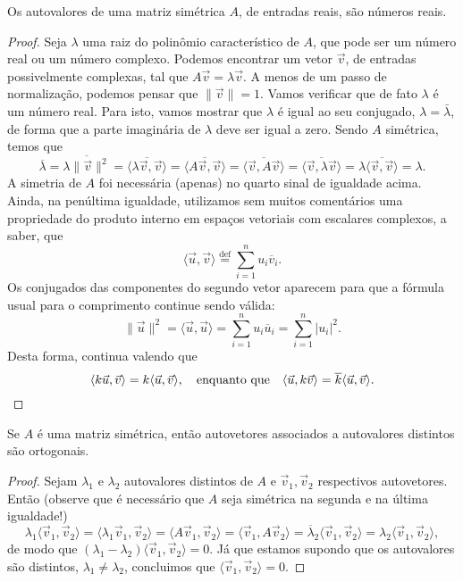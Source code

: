 \documentclass[../livro.tex]{subfiles}
\begin{document}
\begin{proposition}\label{reais}
	Os autovalores de uma matriz simétrica $A$, de entradas reais, são números reais.
\end{proposition}

\begin{proof}
	Seja $\lambda$ uma raiz do polinômio característico de $A$, que pode ser um número real ou um número complexo. Podemos encontrar um vetor $\vec{v}$, de entradas possivelmente complexas, tal que $A\vec{v} = \lambda \vec{v}$. A menos de um passo de normalização, podemos pensar que $\|\vec{v}\| = 1$. Vamos verificar que de fato $\lambda$ é um número real. Para isto, vamos mostrar que $\lambda$ é igual ao seu conjugado, $\lambda = \bar{\lambda}$, de forma que a parte imaginária de $\lambda$ deve ser igual a zero. Sendo $A$ simétrica, temos que
	\[
	\overline{\lambda} = \overline{\lambda \|\vec{v}\|^2} = \overline{\langle \lambda \vec{v}, \vec{v} \rangle} = \overline{\langle A \vec{v}, \vec{v} \rangle} = \overline{\langle \vec{v}, A \vec{v} \rangle} = \overline{\langle \vec{v}, \lambda \vec{v} \rangle} = \lambda \overline{\langle \vec{v}, \vec{v} \rangle} = \lambda.
	\] A simetria de $A$ foi necessária (apenas) no quarto sinal de igualdade acima. Ainda, na penúltima igualdade, utilizamos sem muitos comentários uma propriedade do produto interno em espaços vetoriais com escalares complexos, a saber, que
	\[
	\langle\vec{u}, \vec{v}\rangle \stackrel{\text{def}}{=} \sum_{i=1}^{n} u_i \overline{v}_i.
	\] Os conjugados das componentes do segundo vetor aparecem para que a fórmula usual para o comprimento continue sendo válida:
	\[
	\| \vec{u} \|^2 = \langle\vec{u}, \vec{u}\rangle = \sum_{i=1}^{n} u_i \overline{u}_i = \sum_{i=1}^{n} |u_i|^2.
	\] Desta forma, continua valendo que
	\[
	\langle k\vec{u}, \vec{v} \rangle = k \langle \vec{u}, \vec{v}\rangle, \quad \text{enquanto que} \quad \langle \vec{u},k\vec{v}\rangle = \overline{k} \langle \vec{u}, \vec{v}\rangle. \qedhere
	\]
\end{proof}

\begin{proposition}\label{ortog}
	Se $A$ é uma matriz simétrica, então autovetores associados a autovalores distintos são ortogonais.
\end{proposition}

\begin{proof}
	Sejam $\lambda_1$ e  $\lambda_2$ autovalores distintos de $A$ e $\vec{v}_1, \vec{v}_2$ respectivos autovetores. Então (observe que é necessário que $A$ seja simétrica na segunda e na última igualdade!)
	\[
	\lambda_1 \langle \vec{v}_1, \vec{v}_2\rangle = \langle \lambda_1 \vec{v}_1, \vec{v}_2\rangle = \langle A \vec{v}_1, \vec{v}_2\rangle = \langle \vec{v}_1, A \vec{v}_2\rangle = \overline{\lambda}_2 \langle \vec{v}_1, \vec{v}_2\rangle = \lambda_2 \langle \vec{v}_1, \vec{v}_2\rangle,
	\] de modo que $(\lambda_1 - \lambda_2)\langle \vec{v}_1, \vec{v}_2\rangle = 0$. Já que estamos supondo que os autovalores são distintos, $\lambda_1 \neq \lambda_2$, concluimos que $\langle \vec{v}_1, \vec{v}_2\rangle = 0$.
\end{proof}
\end{document}
